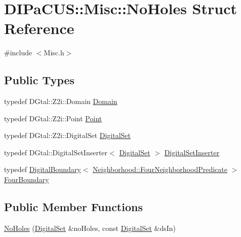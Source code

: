 \hypertarget{structDIPaCUS_1_1Misc_1_1NoHoles}{}\section{D\+I\+Pa\+C\+US\+:\+:Misc\+:\+:No\+Holes Struct Reference}
\label{structDIPaCUS_1_1Misc_1_1NoHoles}


{\ttfamily \#include $<$Misc.\+h$>$}

\subsection*{Public Types}
\begin{DoxyCompactItemize}
\item 
typedef D\+Gtal\+::\+Z2i\+::\+Domain \hyperlink{structDIPaCUS_1_1Misc_1_1NoHoles_a4cce903bbbf4efeeb5c3706f434e1800}{Domain}
\item 
typedef D\+Gtal\+::\+Z2i\+::\+Point \hyperlink{structDIPaCUS_1_1Misc_1_1NoHoles_a596a57c7b9badcf299feb9649c05158b}{Point}
\item 
typedef D\+Gtal\+::\+Z2i\+::\+Digital\+Set \hyperlink{structDIPaCUS_1_1Misc_1_1NoHoles_aea4bec251425e3c31593c97ec33a9dda}{Digital\+Set}
\item 
typedef D\+Gtal\+::\+Digital\+Set\+Inserter$<$ \hyperlink{structDIPaCUS_1_1Misc_1_1NoHoles_aea4bec251425e3c31593c97ec33a9dda}{Digital\+Set} $>$ \hyperlink{structDIPaCUS_1_1Misc_1_1NoHoles_a0d0daa979d1fce71944e06ad181ae6aa}{Digital\+Set\+Inserter}
\item 
typedef \hyperlink{structDIPaCUS_1_1Misc_1_1DigitalBoundary}{Digital\+Boundary}$<$ \hyperlink{classDIPaCUS_1_1Neighborhood_1_1FourNeighborhoodPredicate}{Neighborhood\+::\+Four\+Neighborhood\+Predicate} $>$ \hyperlink{structDIPaCUS_1_1Misc_1_1NoHoles_aef87b5887de2900dc0de612ad9f1d6df}{Four\+Boundary}
\end{DoxyCompactItemize}
\subsection*{Public Member Functions}
\begin{DoxyCompactItemize}
\item 
\hyperlink{structDIPaCUS_1_1Misc_1_1NoHoles_ac100d4aa947d8acc9ae59739184ea488}{No\+Holes} (\hyperlink{structDIPaCUS_1_1Misc_1_1NoHoles_aea4bec251425e3c31593c97ec33a9dda}{Digital\+Set} \&no\+Holes, const \hyperlink{structDIPaCUS_1_1Misc_1_1NoHoles_aea4bec251425e3c31593c97ec33a9dda}{Digital\+Set} \&ds\+In)
\end{DoxyCompactItemize}


